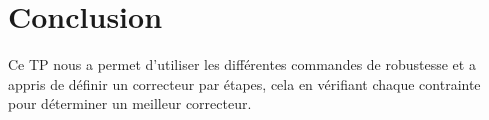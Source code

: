 \documentclass[12pt, a4paper, openany]{report}
\begin{document}
 
 
 


\chapter*{Conclusion}

Ce TP nous a permet d'utiliser les différentes commandes de robustesse et a appris de définir un correcteur par étapes, cela en vérifiant chaque contrainte pour déterminer un meilleur correcteur.\\










 







%
%
\end{document}
